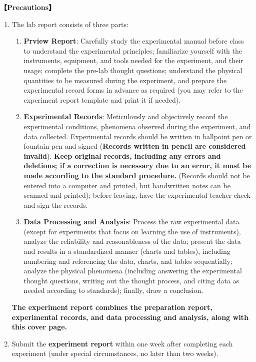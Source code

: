 \textbf{【Precautions】}
\begin{enumerate}
	\item The lab report consists of three parts:
	\begin{enumerate}
		\item \textbf{Prview Report}: Carefully study the experimental manual before class to understand the experimental principles; familiarize yourself with the instruments, equipment, and tools needed for the experiment, and their usage; complete the pre-lab thought questions; understand the physical quantities to be measured during the experiment, and prepare the experimental record forms in advance as required (you may refer to the experiment report template and print it if needed).
		\item \textbf{Experimental Records}: Meticulously and objectively record the experimental conditions, phenomena observed during the experiment, and data collected. Experimental records should be written in ballpoint pen or fountain pen and signed (\textcolor{fred}{\textbf{Records written in pencil are considered invalid}}). \textcolor{fred}{\textbf{Keep original records, including any errors and deletions; if a correction is necessary due to an error, it must be made according to the standard procedure.}} (Records should not be entered into a computer and printed, but handwritten notes can be scanned and printed); before leaving, have the experimental teacher check and sign the records. 
		\item \textbf{Data Processing and Analysis}: Process the raw experimental data (except for experiments that focus on learning the use of instruments), analyze the reliability and reasonableness of the data; present the data and results in a standardized manner (charts and tables), including numbering and referencing the data, charts, and tables sequentially; analyze the physical phenomena (including answering the experimental thought questions, writing out the thought process, and citing data as needed according to standards); finally, draw a conclusion.
	\end{enumerate}
	\textbf{The experiment report combines the preparation report, experimental records, and data processing and analysis, along with this cover page.}
	\item Submit the \textbf{experiment report} within one week after completing each experiment (under special circumstances, no later than two weeks).
\end{enumerate}


